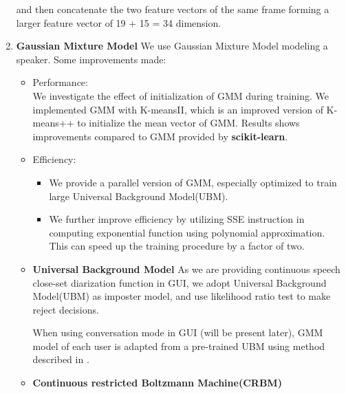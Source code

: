 \begin{enumerate}
			and then concatenate the two feature vectors of the same frame forming
			a larger feature vector of 19 + 15 = 34 dimension.

		\item \textbf{Gaussian Mixture Model}
			We use Gaussian Mixture Model modeling a speaker. Some improvements made:
			\begin{itemize}
				\item Performance: \\
					We investigate the effect of initialization of GMM during
					training. We implemented GMM with
					K-meansII\cite{bahmani2012scalable}, which is an improved
					version of K-means++\cite{arthur2007k} to initialize the
					mean vector of GMM. Results shows improvements compared
					to GMM provided by \textbf{scikit-learn\cite{scikit-learn}}.
				\item Efficiency: \\
					\begin{itemize}
						\item We provide a parallel version of GMM, especially
							optimized to train large Universal Background Model(UBM).
						\item We further improve efficiency by utilizing
							SSE instruction in computing exponential function
							using polynomial approximation. This can speed up
							the training procedure by a factor of two.
					\end{itemize}

		\item \textbf{Universal Background Model}
			As we are providing continuous speech close-set diarization function in
			GUI, we adopt Universal Background Model(UBM) as imposter model,
			and use likelihood ratio test to make reject
			decisions.\cite{reynolds2000speaker}

			When using conversation mode in GUI (will be present later),
			GMM model of each user is adapted from a pre-trained UBM
			using method described in \cite{reynolds2000speaker}.

		\item \textbf{Continuous restricted Boltzmann Machine(CRBM)}


\end{itemize}
\end{enumerate}

